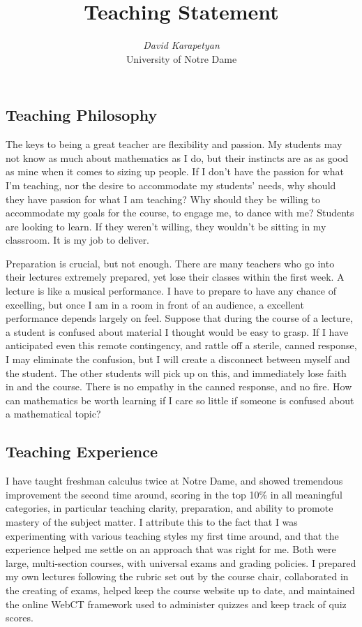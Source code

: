 \documentclass[12pt,oneside]{amsart}
\begin{document}
\title{Teaching Statement}
\author{{\it David Karapetyan}\\
    \/ University of Notre Dame}
\date{}
\maketitle
\thispagestyle{empty} %
\pagestyle{empty} %
\subsection{Teaching Philosophy} The keys to being a great teacher are
flexibility and passion. My students may not know as much about mathematics as
I do, but their instincts are as as good as mine when it comes to sizing up
people. If I don't have the passion for what I'm teaching, nor the desire
to accommodate my students' needs, why should they have passion for what I
am teaching? Why should they be willing to accommodate my goals for the
course, to engage me, to dance with me? Students are looking to learn. If they
weren't willing, they wouldn't be sitting in my classroom. It is my job to
deliver.

Preparation is crucial, but not enough. There are many teachers who go into
their lectures extremely prepared, yet lose their classes within the first week.
A lecture is like a musical performance. I have to prepare to have any chance
of excelling, but once I am in a room in front of an audience, a excellent
performance depends largely on feel. Suppose that during the course of a
lecture, a student is confused about material I thought would be easy to
grasp. If I have anticipated even this remote contingency, and rattle off a
sterile, canned response, I may eliminate the confusion, but I will create a
disconnect between myself and the student. The other students will pick up on
this, and immediately lose faith in  and the course. There is no empathy in
the canned response, and no fire. How can mathematics be worth learning if I
care so little if someone is confused about a mathematical topic?   

\subsection{Teaching Experience} I have taught freshman calculus twice at Notre
Dame, and showed tremendous improvement the second time around, scoring in the
top 10\% in all meaningful categories, in particular teaching clarity,
preparation, and ability to promote mastery of the subject matter. I attribute
this to the fact that I was experimenting with various
teaching styles my first time around, and that the experience helped me settle
on an approach that was right for me. Both were large, multi-section courses,
with universal exams and grading policies. I prepared my own lectures following
the rubric set out by the course chair, collaborated in the creating of exams,
helped keep the course website up to date, and maintained the online WebCT
framework used to administer quizzes and keep track of quiz scores.
\end{document}
